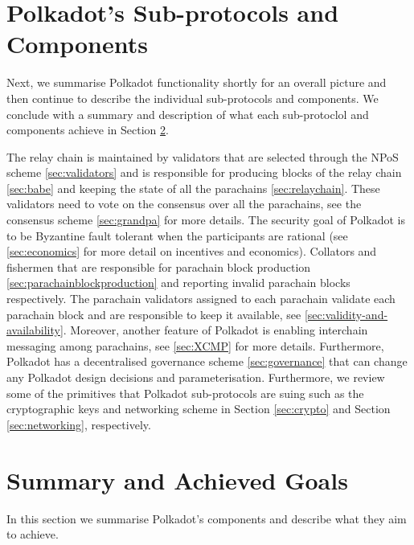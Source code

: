 \section{Polkadot's Sub-protocols and Components}\label{sec:components}
Next, we summarise Polkadot functionality shortly for an overall picture and then continue to describe the individual sub-protocols and components. We conclude with a summary and description of what each sub-protoclol and components achieve in Section \ref{sec:summary}. 

The relay chain is maintained by validators that are selected through the NPoS scheme \ref{sec:validators} and is responsible for producing blocks of the relay chain \ref{sec:babe} and keeping the state of all the parachains \ref{sec:relaychain}.
These validators need to vote on the consensus over all the parachains, see the consensus scheme \ref{sec:grandpa} for more details.
The security goal of Polkadot is to be Byzantine fault tolerant when the participants are rational (see \ref{sec:economics} for more detail on incentives and economics).
Collators and fishermen that are responsible for parachain block production \ref{sec:parachainblockproduction} and reporting invalid parachain blocks respectively.
The parachain validators assigned to each parachain validate each parachain block and are responsible to keep it available, see \ref{sec:validity-and-availability}. Moreover, another feature of Polkadot is enabling interchain messaging among parachains, see \ref{sec:XCMP} for more details.
Furthermore, Polkadot has a decentralised governance scheme \ref{sec:governance} that can change any Polkadot design decisions and parameterisation.
Furthermore, we review some of the primitives that Polkadot sub-protocols are suing such as the cryptographic keys and networking scheme in Section \ref{sec:crypto} and Section \ref{sec:networking}, respectively. 









\section{Summary and Achieved Goals}\label{sec:summary}
In this section we summarise Polkadot's components and describe what they aim to achieve. 

